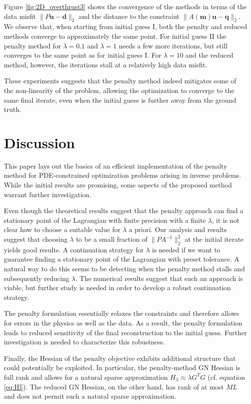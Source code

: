 \documentclass{iopart}
\begin{document}
Figure \ref{fig:2D_overthrust3} shows the convergence of the methods in terms of the data misfit $\|P\mathbf{u} - \mathbf{d}\|_2$ and the distance to the constraint $\|A(\mathbf{m})\mathbf{u} - \mathbf{q}\|_2$. We observe that, when starting from initial guess I, both the penalty and reduced methods converge to approximately the same point. For initial guess II the penalty method for $\lambda=0.1$ and $\lambda=1$ needs a few more iterations, but still converges to the same point as for initial guess I. For $\lambda=10$ and the reduced method, however, the iterations stall at a relatively high data misfit.

These experiments suggests that the penalty method indeed mitigates some of the non-linearity of the problem, allowing the optimization to converge to the same final iterate, even when the initial guess is further away from the ground truth. 
\section{Discussion}
\label{discussion}
This paper lays out the basics of an efficient implementation of the penalty method for PDE-constrained optimization problems arising in inverse problems. While the initial results are promising, some aspects of the proposed method warrant further investigation.

Even though the theoretical results suggest that the penalty approach can find a stationary point of the Lagrangian with finite precision with a finite $\lambda$, it is not clear how to choose a suitable value for $\lambda$ a priori. Our analysis and results suggest that choosing $\lambda$ to be a small fraction of $\|PA^{-1}\|_2^2$ at the initial iterate yields good results. A continuation strategy for $\lambda$ is needed if we want to guarantee finding a stationary point of the Lagrangian with preset tolerance. A natural way to do this seems to be detecting when the penalty method stalls and subsequently reducing $\lambda$. The numerical results suggest that such an approach is viable, but further study is needed in order to develop a robust continuation strategy.

The penalty formulation essentially relaxes the constraints and therefore allows for errors in the physics as well as the data. As a result, the penalty formulation leads to reduced sensitivity of the final reconstruction to the initial guess. Further investigation is needed to characterize this robustness.  

Finally, the Hessian of the penalty objective exhibits additional structure that could potentially be exploited. In particular, the penalty-method GN Hessian is full rank and allows for a natural sparse approximation $H_{\lambda} \approx \lambda G^T\!G$ (cf. equation \ref{eq:Hl}). The reduced GN Hessian, on the other hand, has rank of at most $ML$ and does not permit such a natural sparse approximation.
\end{document}

